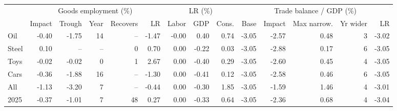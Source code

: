 \begin{tabular}{lrrrrrrrrrrrrr}
\toprule
 & \multicolumn{5}{c}{Goods employment (\%)} & \multicolumn{3}{c}{LR (\%)} & \multicolumn{5}{c}{Trade balance / GDP (\%)} \\
\cmidrule(lr){2-6}\cmidrule(lr){7-9}\cmidrule(lr){10-14}
 & Impact & Trough & Year & Recovers & LR & Labor & GDP & Cons. & Base & Impact & Max narrow. & Yr wider & LR \\
\midrule
Oil & -0.40 & -1.75 & 14 & -- & -1.47 & -0.00 & 0.40 & 0.74 & -3.05 & -2.57 & 0.48 & 3 & -3.02 \\
Steel & 0.10 & -- & -- & 0 & 0.70 & 0.00 & -0.22 & 0.03 & -3.05 & -2.88 & 0.17 & 6 & -3.05 \\
Toys & -0.02 & -0.02 & 0 & 1 & 2.67 & 0.00 & -0.40 & 0.29 & -3.05 & -2.60 & 0.45 & 4 & -3.05 \\
Cars & -0.36 & -1.88 & 16 & -- & -1.30 & 0.00 & -0.41 & 0.12 & -3.05 & -2.58 & 0.46 & 6 & -3.05 \\
All & -1.13 & -3.20 & 7 & -- & -0.44 & 0.00 & -0.30 & 1.85 & -3.05 & -1.59 & 1.46 & 4 & -3.01 \\
2025 & -0.37 & -1.01 & 7 & 48 & 0.27 & 0.00 & -0.33 & 0.64 & -3.05 & -2.36 & 0.68 & 4 & -3.04 \\
\bottomrule
\end{tabular}
